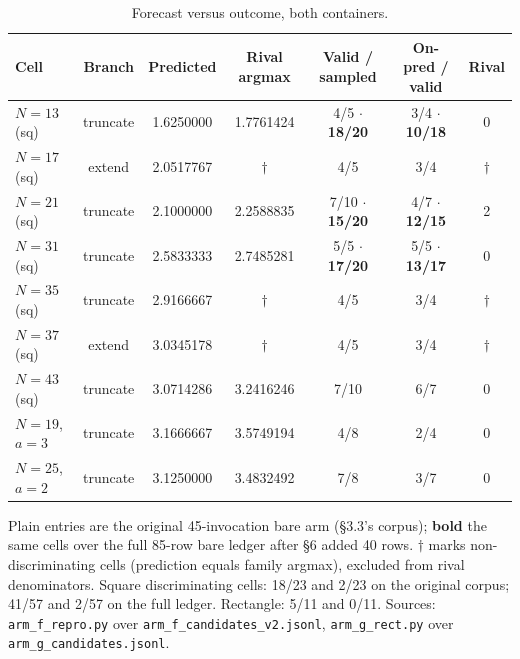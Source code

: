 \begin{table}[t]
\centering
\caption{Forecast versus outcome, both containers.}
\label{tab:forecast}
\small
\begin{tabular}{@{}lcccccc@{}}
\toprule
Cell & Branch & Predicted & Rival argmax & Valid / sampled & On-pred / valid & Rival \\
\midrule
$N{=}13$ (sq) & truncate & 1.6250000 & 1.7761424 & 4/5 $\cdot$ \textbf{18/20} & 3/4 $\cdot$ \textbf{10/18} & 0 \\
$N{=}17$ (sq) & extend & 2.0517767 & $\dagger$ & 4/5 & 3/4 & $\dagger$ \\
$N{=}21$ (sq) & truncate & 2.1000000 & 2.2588835 & 7/10 $\cdot$ \textbf{15/20} & 4/7 $\cdot$ \textbf{12/15} & 2 \\
$N{=}31$ (sq) & truncate & 2.5833333 & 2.7485281 & 5/5 $\cdot$ \textbf{17/20} & 5/5 $\cdot$ \textbf{13/17} & 0 \\
$N{=}35$ (sq) & truncate & 2.9166667 & $\dagger$ & 4/5 & 3/4 & $\dagger$ \\
$N{=}37$ (sq) & extend & 3.0345178 & $\dagger$ & 4/5 & 3/4 & $\dagger$ \\
$N{=}43$ (sq) & truncate & 3.0714286 & 3.2416246 & 7/10 & 6/7 & 0 \\
$N{=}19$, $a{=}3$ & truncate & 3.1666667 & 3.5749194 & 4/8 & 2/4 & 0 \\
$N{=}25$, $a{=}2$ & truncate & 3.1250000 & 3.4832492 & 7/8 & 3/7 & 0 \\
\bottomrule
\end{tabular}

\vspace{0.5ex}
\begin{minipage}{0.95\linewidth}
\footnotesize
Plain entries are the original 45-invocation bare arm (\S3.3's corpus); \textbf{bold} the same cells
over the full 85-row bare ledger after \S6 added 40 rows. $\dagger$ marks non-discriminating cells
(prediction equals family argmax), excluded from rival denominators. Square discriminating
cells: 18/23 and 2/23 on the original corpus; 41/57 and 2/57 on the full ledger. Rectangle:
5/11 and 0/11. Sources: \texttt{arm\_f\_repro.py} over \texttt{arm\_f\_candidates\_v2.jsonl}, \texttt{arm\_g\_rect.py} over
\texttt{arm\_g\_candidates.jsonl}.
\end{minipage}
\end{table}

